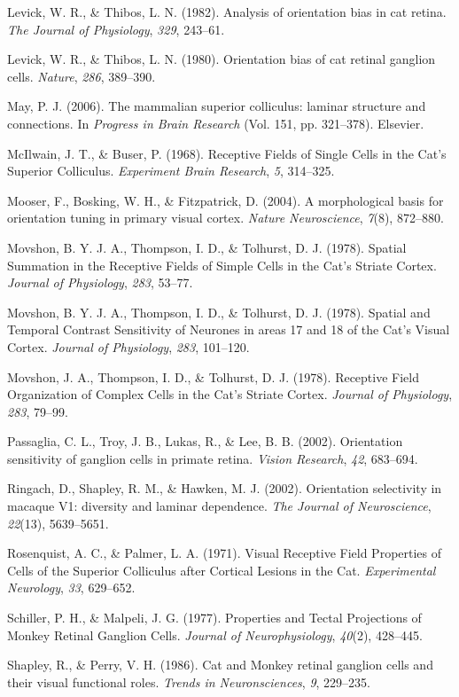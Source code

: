 Levick, W. R., \& Thibos, L. N. (1982). Analysis of orientation bias in
cat retina. \emph{The Journal of Physiology}, \emph{329}, 243--61.

Levick, W. R., \& Thibos, L. N. (1980). Orientation bias of cat retinal
ganglion cells. \emph{Nature}, \emph{286}, 389--390.

May, P. J. (2006). The mammalian superior colliculus: laminar structure
and connections. In \emph{Progress in Brain Research} (Vol. 151, pp.
321--378). Elsevier.

McIlwain, J. T., \& Buser, P. (1968). Receptive Fields of Single Cells
in the Cat's Superior Colliculus. \emph{Experiment Brain Research},
\emph{5}, 314--325.

Mooser, F., Bosking, W. H., \& Fitzpatrick, D. (2004). A morphological
basis for orientation tuning in primary visual cortex. \emph{Nature
Neuroscience}, \emph{7}(8), 872--880.

Movshon, B. Y. J. A., Thompson, I. D., \& Tolhurst, D. J. (1978).
Spatial Summation in the Receptive Fields of Simple Cells in the Cat's
Striate Cortex. \emph{Journal of Physiology}, \emph{283}, 53--77.

Movshon, B. Y. J. A., Thompson, I. D., \& Tolhurst, D. J. (1978).
Spatial and Temporal Contrast Sensitivity of Neurones in areas 17 and 18
of the Cat's Visual Cortex. \emph{Journal of Physiology}, \emph{283},
101--120.

Movshon, J. A., Thompson, I. D., \& Tolhurst, D. J. (1978). Receptive
Field Organization of Complex Cells in the Cat's Striate Cortex.
\emph{Journal of Physiology}, \emph{283}, 79--99.

Passaglia, C. L., Troy, J. B., Lukas, R., \& Lee, B. B. (2002).
Orientation sensitivity of ganglion cells in primate retina.
\emph{Vision Research}, \emph{42}, 683--694.

Ringach, D., Shapley, R. M., \& Hawken, M. J. (2002). Orientation
selectivity in macaque V1: diversity and laminar dependence. \emph{The
Journal of Neuroscience}, \emph{22}(13), 5639--5651.

Rosenquist, A. C., \& Palmer, L. A. (1971). Visual Receptive Field
Properties of Cells of the Superior Colliculus after Cortical Lesions in
the Cat. \emph{Experimental Neurology}, \emph{33}, 629--652.

Schiller, P. H., \& Malpeli, J. G. (1977). Properties and Tectal
Projections of Monkey Retinal Ganglion Cells. \emph{Journal of
Neurophysiology}, \emph{40}(2), 428--445.

Shapley, R., \& Perry, V. H. (1986). Cat and Monkey retinal ganglion
cells and their visual functional roles. \emph{Trends in
Neuronsciences}, \emph{9}, 229--235.

